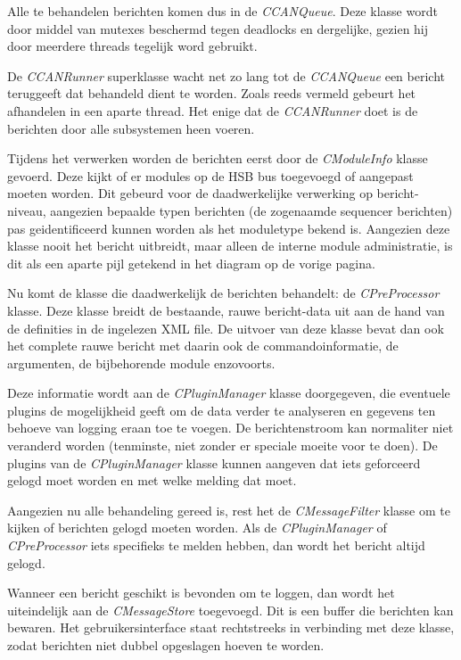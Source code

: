 Alle te behandelen berichten komen dus in de \emph{CCANQueue}. Deze klasse wordt door middel van mutexes beschermd tegen deadlocks en dergelijke, gezien hij door meerdere threads tegelijk word gebruikt.

De \emph{CCANRunner} superklasse wacht net zo lang tot de \emph{CCANQueue} een bericht teruggeeft dat behandeld dient te worden. Zoals reeds vermeld gebeurt het afhandelen in een aparte thread. Het enige dat de \emph{CCANRunner} doet is de berichten door alle subsystemen heen voeren.

Tijdens het verwerken worden de berichten eerst door de \emph{CModuleInfo} klasse gevoerd. Deze kijkt of er modules op de HSB bus toegevoegd of aangepast moeten worden. Dit gebeurd voor de daadwerkelijke verwerking op bericht-niveau, aangezien bepaalde typen berichten (de zogenaamde sequencer berichten) pas geidentificeerd kunnen worden als het moduletype bekend is. Aangezien deze klasse nooit het bericht uitbreidt, maar alleen de interne module administratie, is dit als een aparte pijl getekend in het diagram op de vorige pagina.

Nu komt de klasse die daadwerkelijk de berichten behandelt: de \emph{CPreProcessor} klasse. Deze klasse breidt de bestaande, rauwe bericht-data uit aan de hand van de definities in de ingelezen XML file. De uitvoer van deze klasse bevat dan ook het complete rauwe bericht met daarin ook de commandoinformatie, de argumenten, de bijbehorende module enzovoorts.

Deze informatie wordt aan de \emph{CPluginManager} klasse doorgegeven, die eventuele plugins de mogelijkheid geeft om de data verder te analyseren en gegevens ten behoeve van logging eraan toe te voegen. De berichtenstroom kan normaliter niet veranderd worden (tenminste, niet zonder er speciale moeite voor te doen). De plugins van de \emph{CPluginManager} klasse kunnen aangeven dat iets geforceerd gelogd moet worden en met welke melding dat moet.

Aangezien nu alle behandeling gereed is, rest het de \emph{CMessageFilter} klasse om te kijken of berichten gelogd moeten worden. Als de \emph{CPluginManager} of \emph{CPreProcessor} iets specifieks te melden hebben, dan wordt het bericht altijd gelogd.

Wanneer een bericht geschikt is bevonden om te loggen, dan wordt het uiteindelijk aan de \emph{CMessageStore} toegevoegd. Dit is een buffer die berichten kan bewaren. Het gebruikersinterface staat rechtstreeks in verbinding met deze klasse, zodat berichten niet dubbel opgeslagen hoeven te worden.

